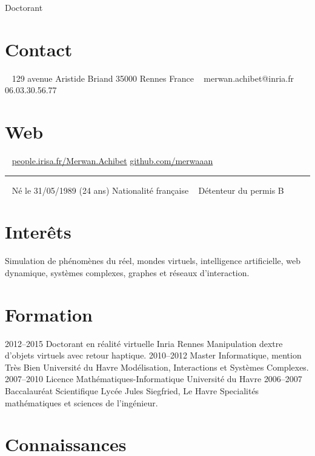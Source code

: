 \documentclass[]{friggeri-cv}
\begin{document}
       {Doctorant}

\begin{aside}
  \section{Contact}
    ~
    129 avenue Aristide Briand
    35000 Rennes
    France
    ~
    merwan.achibet@inria.fr
    ~
    06.03.30.56.77
  \section{Web}
    ~
    \href{http://people.irisa.fr/Merwan.Achibet/}{people.irisa.fr/Merwan.Achibet}
    \href{http://github.com/merwaaan}{github.com/merwaaan}
    ~
    {\color{lightergray}\rule{3cm}{0.01cm}}
    ~
    Né le 31/05/1989 (24 ans)
    Nationalité française
    ~
    Détenteur du permis B
\end{aside}

\section{Interêts}

Simulation de phénomènes du réel, mondes virtuels, intelligence artificielle, web dynamique, systèmes complexes, graphes et réseaux d'interaction.

\section{Formation}

\begin{entrylist}
  \entry
    {2012–2015}
    {Doctorant en réalité virtuelle}
    {Inria Rennes}
    {Manipulation dextre d’objets virtuels avec retour haptique.}
  \entry
    {2010–2012}
    {Master Informatique, mention Très Bien}
    {Université du Havre}
    {Modélisation, Interactions et Systèmes Complexes.}
  \entry
    {2007–2010}
    {Licence Mathématiques-Informatique}
    {Université du Havre}
    {}
  \entry
    {2006–2007}
    {Baccalauréat Scientifique}
    {Lycée Jules Siegfried, Le Havre}
    {Specialités mathématiques et sciences de l'ingénieur.}
\end{entrylist}

\section{Connaissances}
\end{document}

